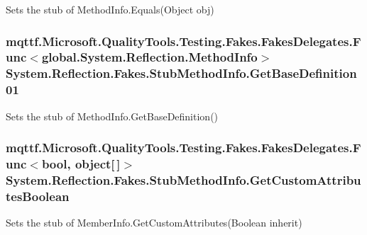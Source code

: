Sets the stub of Method\-Info.\-Equals(\-Object obj)

\hypertarget{class_system_1_1_reflection_1_1_fakes_1_1_stub_method_info_a0a66f396d812debf2a9185ebcc05e29d}{
\subsubsection[{Get\-Base\-Definition01}]{\setlength{\rightskip}{0pt plus 5cm}mqttf.\-Microsoft.\-Quality\-Tools.\-Testing.\-Fakes.\-Fakes\-Delegates.\-Func$<$global.\-System.\-Reflection.\-Method\-Info$>$ System.\-Reflection.\-Fakes.\-Stub\-Method\-Info.\-Get\-Base\-Definition01}}\label{class_system_1_1_reflection_1_1_fakes_1_1_stub_method_info_a0a66f396d812debf2a9185ebcc05e29d}


Sets the stub of Method\-Info.\-Get\-Base\-Definition()

\hypertarget{class_system_1_1_reflection_1_1_fakes_1_1_stub_method_info_abf1faafa9b81bfef7dea1fb0443fde5a}{
\subsubsection[{Get\-Custom\-Attributes\-Boolean}]{\setlength{\rightskip}{0pt plus 5cm}mqttf.\-Microsoft.\-Quality\-Tools.\-Testing.\-Fakes.\-Fakes\-Delegates.\-Func$<$bool, object\mbox{[}$\,$\mbox{]}$>$ System.\-Reflection.\-Fakes.\-Stub\-Method\-Info.\-Get\-Custom\-Attributes\-Boolean}}\label{class_system_1_1_reflection_1_1_fakes_1_1_stub_method_info_abf1faafa9b81bfef7dea1fb0443fde5a}


Sets the stub of Member\-Info.\-Get\-Custom\-Attributes(\-Boolean inherit)

